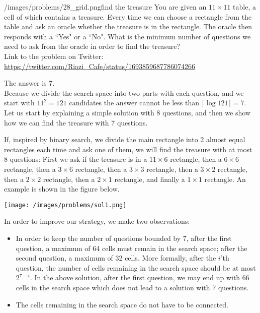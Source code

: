 \begin{problem}{/images/problems/28_grid.png}{find the treasure}
	You are given an $11 \times 11$ table, a cell of which contains a treasure. Every time we can choose a  rectangle from the table and ask an oracle whether the treasure is in the rectangle. The oracle then responds with a ``Yes" or a ``No". What is the minimum number of questions we need to ask from the oracle in order to find the treasure?\\[0.2cm]

Link to the problem on Twitter:  \url{https://twitter.com/Riazi_Cafe/status/1693859687786074266}
\end{problem}
\begin{solution}
The answer is 7.\\[0.2cm]

Because we divide the search space into two parts with each question, and we start with $11^2 = 121$ candidates the answer cannot be less than $\lceil \log 121\rceil=7$. Let us start by explaining a simple solution with 8 questions, and then we show how we can find the treasure with 7 questions.

If, inspired by binary search, we divide the main rectangle into 2 almost equal rectangles each time and ask one of them, we will find the treasure with at most 8 questions: First we ask if the treasure is in a  $11\times 6$ rectangle, then a $6\times 6$ rectangle, then a $3 \times 6$ rectangle, then a $3 \times 3$ rectangle, then a $3 \times 2$ rectangle, then a $2 \times 2$ rectangle, then a $2 \times 1$ rectangle, and finally a $1 \times 1$ rectangle. An example is shown in the figure below.

\begin{center}
	\texttt{[image: /images/problems/sol1.png]}
\end{center}

In order to improve our strategy, we make two observations:
\begin{itemize}
\item In order to keep the number of questions bounded by 7, after the first question, a maximum of 64 cells must remain in the search space; after the second question, a maximum of 32 cells. More formally, after the $i$'th question, the number of cells remaining in the search space should be at most $2^{7-i}$. In the above solution, after the first question, we may end up with 66 cells in the search space which does not lead to a solution with 7 questions.
\item The cells remaining in the search space do not have to be connected.
\end{itemize}


\end{solution}
